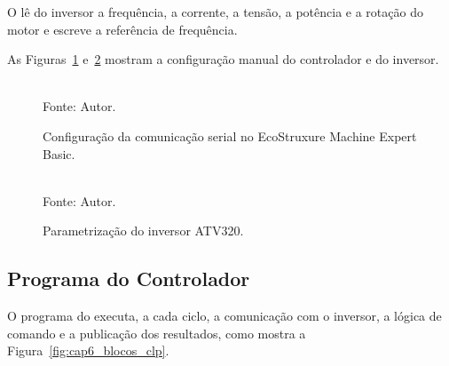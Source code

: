\par O  lê do inversor a frequência, a corrente, a tensão, a potência e a rotação do motor e escreve a referência de frequência.

\par As Figuras~\ref{fig:cap6_foto_mebasic} e~\ref{fig:cap6_foto_atv320} mostram a configuração manual do controlador e do inversor.

\begin{figure}[H]
    \centering
    \caption{Configuração da comunicação serial no EcoStruxure Machine Expert Basic.}
    \label{fig:cap6_foto_mebasic}
    \vspace{0.2cm} \\
    Fonte: Autor.
\end{figure}

\begin{figure}[H]
    \centering
    \caption{Parametrização do inversor ATV320.}
    \label{fig:cap6_foto_atv320}
    \vspace{0.2cm} \\
    Fonte: Autor.
\end{figure}

\subsection{Programa do Controlador}

\par O programa do  executa, a cada ciclo, a comunicação com o inversor, a lógica de comando e a publicação dos resultados, como mostra a Figura~\ref{fig:cap6_blocos_clp}.

